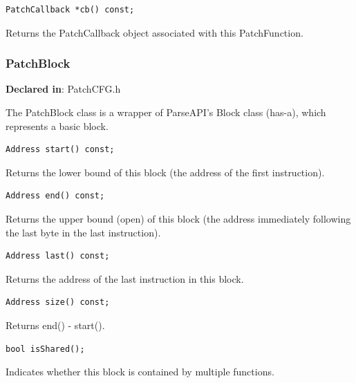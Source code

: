\documentclass[11pt]{article}
\begin{document}
\begin{verbatim}
PatchCallback *cb() const;

\end{verbatim}



Returns the PatchCallback object associated with this PatchFunction.

\subsubsection{PatchBlock}
\label{sec-3.2.10}

\textbf{Declared in}: PatchCFG.h

The PatchBlock class is a wrapper of ParseAPI's Block class (has-a), which
represents a basic block.


\begin{verbatim}
Address start() const;

\end{verbatim}



Returns the lower bound of this block (the address of the first instruction).


\begin{verbatim}
Address end() const;

\end{verbatim}



Returns the upper bound (open) of this block (the address immediately following
the last byte in the last instruction).


\begin{verbatim}
Address last() const;

\end{verbatim}



Returns the address of the last instruction in this block.


\begin{verbatim}
Address size() const;

\end{verbatim}



Returns end() - start().


\begin{verbatim}
bool isShared();

\end{verbatim}



Indicates whether this block is contained by multiple functions.
\end{document}
